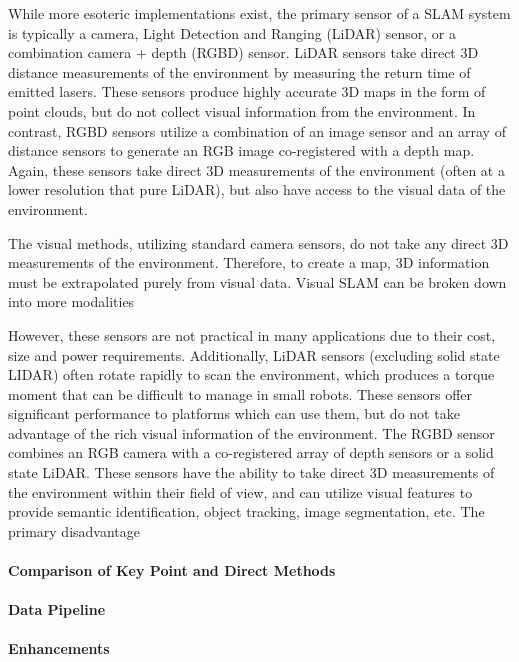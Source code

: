 While more esoteric implementations exist, the primary sensor of a SLAM system is typically a camera, Light Detection and Ranging (LiDAR) sensor, or a combination camera + depth (RGBD) sensor. LiDAR sensors take direct 3D distance measurements of the environment by measuring the return time of emitted lasers. These sensors produce highly accurate 3D maps in the form of point clouds, but do not collect visual information from the environment. In contrast, RGBD sensors utilize a combination of an image sensor and an array of distance sensors to generate an RGB image co-registered with a depth map. Again, these sensors take direct 3D measurements of the environment (often at a lower resolution that pure LiDAR), but also have access to the visual data of the environment.

The visual methods, utilizing standard camera sensors, do not take any direct 3D measurements of the environment. Therefore, to create a map, 3D information must be extrapolated purely from visual data. Visual SLAM can be broken down into more modalities

However, these sensors are not practical in many applications due to their cost, size and power requirements. Additionally, LiDAR sensors (excluding solid state LIDAR) often rotate rapidly to scan the environment, which produces a torque moment that can be difficult to manage in small robots. These sensors offer significant performance to platforms which can use them, but do not take advantage of the rich visual information of the environment. The RGBD sensor combines an RGB camera with a co-registered array of depth sensors or a solid state LiDAR. These sensors have the ability to take direct 3D measurements of the environment within their field of view, and can utilize visual features to provide semantic identification, object tracking, image segmentation, etc. The primary disadvantage

\paragraph{Comparison of Key Point and Direct Methods}




\paragraph{Data Pipeline}

\paragraph{Enhancements}